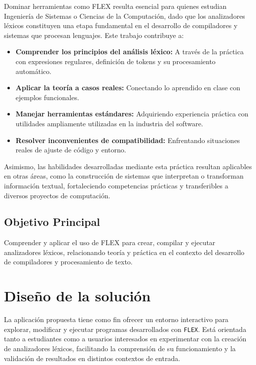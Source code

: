 \documentclass{article}
\begin{document}
Dominar herramientas como FLEX resulta esencial para quienes estudian Ingeniería de Sistemas o Ciencias de la Computación, dado que los analizadores léxicos constituyen una etapa fundamental en el desarrollo de compiladores y sistemas que procesan lenguajes. Este trabajo contribuye a:
\begin{itemize}
    \item \textbf{Comprender los principios del análisis léxico:} A través de la práctica con expresiones regulares, definición de tokens y su procesamiento automático.
    \item \textbf{Aplicar la teoría a casos reales:} Conectando lo aprendido en clase con ejemplos funcionales.
    \item \textbf{Manejar herramientas estándares:} Adquiriendo experiencia práctica con utilidades ampliamente utilizadas en la industria del software.
    \item \textbf{Resolver inconvenientes de compatibilidad:} Enfrentando situaciones reales de ajuste de código y entorno.
\end{itemize}

Asimismo, las habilidades desarrolladas mediante esta práctica resultan aplicables en otras áreas, como la construcción de sistemas que interpretan o transforman información textual, fortaleciendo competencias prácticas y transferibles a diversos proyectos de computación.

\subsection{Objetivo Principal}

Comprender y aplicar el uso de FLEX para crear, compilar y ejecutar analizadores léxicos, relacionando teoría y práctica en el contexto del desarrollo de compiladores y procesamiento de texto.


\section{Diseño de la solución}\label{sec:dis}

La aplicación propuesta tiene como fin ofrecer un entorno interactivo para explorar, modificar y ejecutar programas desarrollados con \texttt{FLEX}. Está orientada tanto a estudiantes como a usuarios interesados en experimentar con la creación de analizadores léxicos, facilitando la comprensión de su funcionamiento y la validación de resultados en distintos contextos de entrada.
\end{document}
